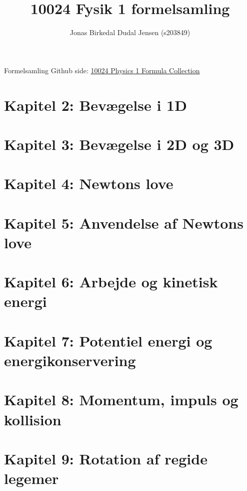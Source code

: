 \documentclass{article}
\title{10024 Fysik 1 formelsamling}
\date{}
\author{Jonas Birkedal Dudal Jensen (s203849)}
\begin{document}
	\maketitle
	{\begin{center}
		\large Formelsamling Github side: \href{https://github.com/jondalnas/10024-Physics-1-Formula-Collection}{10024 Physics 1 Formula Collection}
	\end{center}
	\newpage

	\tableofcontents
	\newpage

	\section{Kapitel 2: Bevægelse i 1D}
	

	\section{Kapitel 3: Bevægelse i 2D og 3D}
	

	\section{Kapitel 4: Newtons love}
	

	\section{Kapitel 5: Anvendelse af Newtons love}
	
	
	\section{Kapitel 6: Arbejde og kinetisk energi}
	
	
	\section{Kapitel 7: Potentiel energi og energikonservering}
	

	\section{Kapitel 8: Momentum, impuls og kollision}
	

	\section{Kapitel 9: Rotation af regide legemer}
	

}
\end{document}
